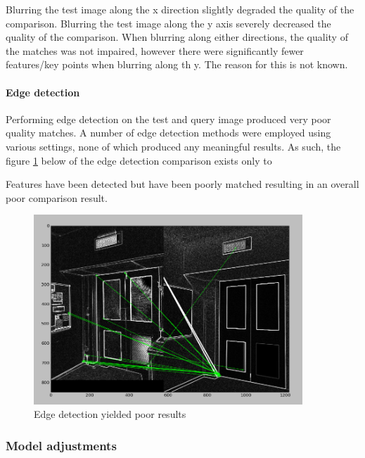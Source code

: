 \documentclass[11pt,a4paper]{report}
\begin{document}
					Blurring the test image along the x direction slightly degraded the quality of the comparison. Blurring the test image along the y axis severely decreased the quality of the comparison.
					When blurring along either directions, the quality of the matches was not impaired, however there were significantly fewer features/key points when blurring along th y. The reason for this is not known.
					
				\paragraph{Edge detection}
					Performing edge detection on the test and query image produced very poor quality matches. A number of edge detection methods were employed using various settings, none of which produced any meaningful results.
					As such, the figure \ref{fig:edge_detection_results} below of the edge detection comparison exists only to
					
					Features have been detected but have been poorly matched resulting in an overall poor comparison result.
					\begin{figure}[H]
						\centering
						\includegraphics[width=0.9\textwidth]{edge_detection_results}
						\caption{Edge detection yielded poor results}
						\label{fig:edge_detection_results}
					\end{figure}
					
			\subsubsection{Model adjustments}
\end{document}
